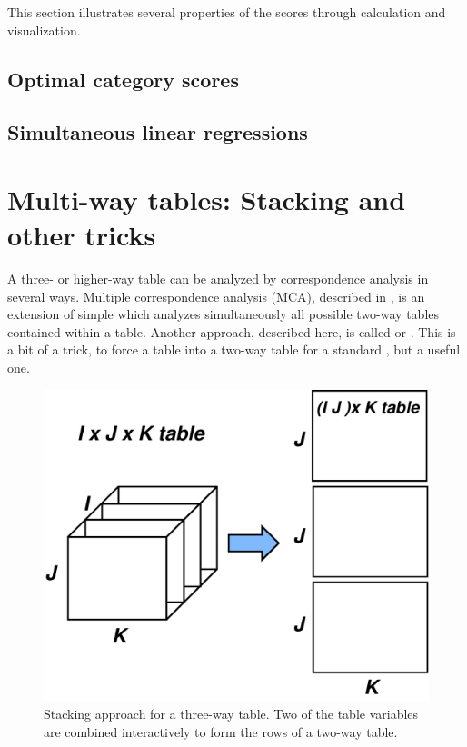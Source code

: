 \documentclass[11pt]{book}\usepackage[]{graphicx}\usepackage[]{color}
\begin{document}
This section illustrates several properties of the \ca
scores through calculation and visualization.


\subsection{Optimal category scores}\label{sec:ca-optimal-scores}

\subsection{Simultaneous linear regressions}\label{sec:ca-linreg}


\section{Multi-way tables: Stacking and other tricks}\label{sec:ca-multiway}

A three- or higher-way table can be analyzed by correspondence
analysis in several ways.
Multiple correspondence analysis (MCA), described in ,
is an extension of simple
\ca which analyzes simultaneously all possible two-way tables
contained within a \mway table.
Another approach, described here, is called 
 or . This is a bit of a trick, 
to force a \mway table into a two-way table for a standard \ca,
but a useful one.

\begin{figure}
\centering
\includegraphics[width=.6\textwidth]{ch06/fig/stacking}
\caption{Stacking approach for a three-way table. Two of the table variables are combined interactively to form the rows of a two-way table.}\label{fig:stacking}
\end{figure}
\end{document}
